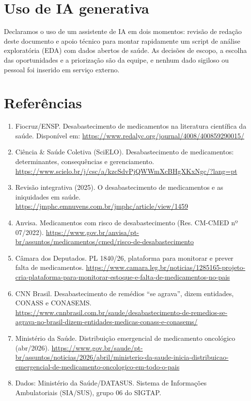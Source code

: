 \documentclass[11pt,a4paper]{article}
\begin{document}
\section*{Uso de IA generativa}
Declaramos o uso de um assistente de IA em dois momentos: revisão de redação deste documento e apoio técnico para montar rapidamente um script de análise exploratória (EDA) com dados abertos de saúde. As decisões de escopo, a escolha das oportunidades e a priorização são da equipe, e nenhum dado sigiloso ou pessoal foi inserido em serviço externo.

\section*{Referências}
\small
\begin{enumerate}[leftmargin=1.4em, itemsep=1pt]
    \item Fiocruz/ENSP. Desabastecimento de medicamentos na literatura científica da saúde. Disponível em: \url{https://www.redalyc.org/journal/4008/400859290015/}
    \item Ciência \& Saúde Coletiva (SciELO). Desabastecimento de medicamentos: determinantes, consequências e gerenciamento. \url{https://www.scielo.br/j/csc/a/kzcSdvPjQWWmXcBHgXKxNgc/?lang=pt}
    \item Revisão integrativa (2025). O desabastecimento de medicamentos e as iniquidades em saúde. \url{https://jmphc.emnuvens.com.br/jmphc/article/view/1459}
    \item Anvisa. Medicamentos com risco de desabastecimento (Res. CM-CMED nº 07/2022). \url{https://www.gov.br/anvisa/pt-br/assuntos/medicamentos/cmed/risco-de-desabastecimento}
    \item Câmara dos Deputados. PL 1840/26, plataforma para monitorar e prever falta de medicamentos. \url{https://www.camara.leg.br/noticias/1285165-projeto-cria-plataforma-para-monitorar-estoque-e-falta-de-medicamentos-no-pais}
    \item CNN Brasil. Desabastecimento de remédios ``se agrava'', dizem entidades, CONASS e CONASEMS. \url{https://www.cnnbrasil.com.br/saude/desabastecimento-de-remedios-se-agrava-no-brasil-dizem-entidades-medicas-conass-e-conasems/}
    \item Ministério da Saúde. Distribuição emergencial de medicamento oncológico (abr/2026). \url{https://www.gov.br/saude/pt-br/assuntos/noticias/2026/abril/ministerio-da-saude-inicia-distribuicao-emergencial-de-medicamento-oncologico-em-todo-o-pais}
    \item Dados: Ministério da Saúde/DATASUS. Sistema de Informações Ambulatoriais (SIA/SUS), grupo 06 do SIGTAP.
\end{enumerate}
\end{document}
